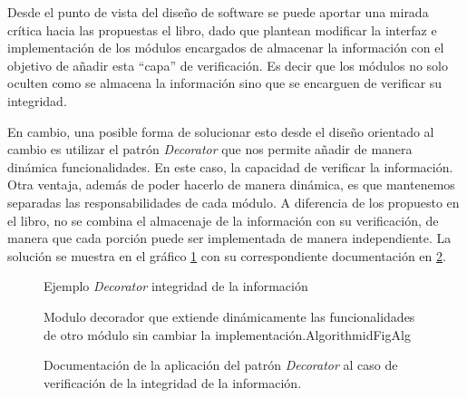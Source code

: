 Desde el punto de vista del diseño de software se puede aportar una mirada crítica hacia las propuestas el libro, dado que plantean modificar la interfaz e implementación de los módulos encargados de almacenar la información con el objetivo de añadir esta ``capa'' de verificación. Es decir que los módulos no solo oculten como se almacena la información sino que se encarguen de verificar su integridad. 

En cambio, una posible forma de solucionar esto desde el diseño orientado al cambio es utilizar el patrón \textit{Decorator} que nos permite añadir de manera dinámica funcionalidades. En este caso, la capacidad de verificar la información. Otra ventaja, además de poder hacerlo de manera dinámica, es que mantenemos separadas las responsabilidades de cada módulo. A diferencia de los propuesto en el libro, no se combina el almacenaje de la información con su verificación, de manera que cada porción puede ser implementada de manera independiente. La solución se muestra en el gráfico \ref{decorator} con su correspondiente documentación en \ref{docDecorator}.

\begin{figure}[h]
\caption{Ejemplo \textit{Decorator} integridad de la información}
\label{decorator}
\begin{center}
\end{center}
\end{figure}

\begin{figure}[]
\caption{Documentación de la aplicación del patrón \textit{Decorator} al caso de verificación de la integridad de la información.}
\label{docDecorator}
\begin{pattern}[]{Modulo decorador que extiende dinámicamente las funcionalidades de otro módulo sin cambiar la implementación.}{Algorithm}{idFigAlg}
\assigns
{}

\end{pattern}
\end{figure}


